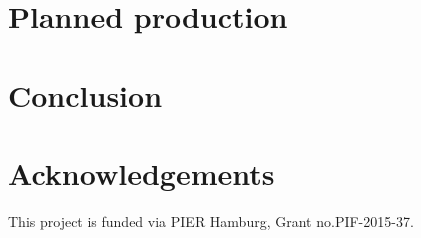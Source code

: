 \documentclass[a4paper,10pt]{article}
\newcommand*{\notFOREPJ}{}%
\begin{document}
\section{Planned production}
\label{sec:production}
\ifdefined\notFOREPJ
 
\else
 
\fi


\section{Conclusion}
\label{sec:conclusion}
\ifdefined\notFOREPJ
 
\else
 
\fi

\section*{Acknowledgements}
This project is funded via PIER Hamburg, Grant no.PIF-2015-37.



{\small


}
\end{document}
